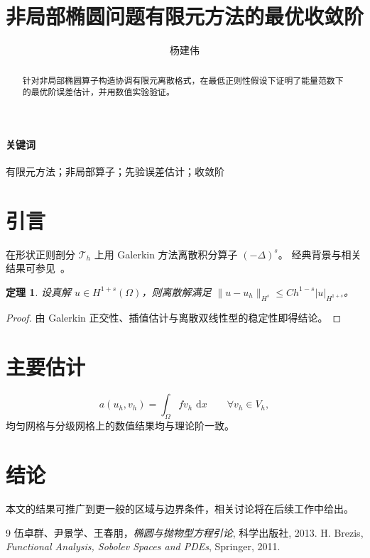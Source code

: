 \documentclass[UTF8,fontset=fandol,11pt]{ctexart}
\title{非局部椭圆问题有限元方法的最优收敛阶}
\author{杨建伟}
\date{}
\newtheorem{theorem}{定理}[section]
\newcommand{\Om}{\Omega}
\newcommand{\dd}{\,\mathrm{d}}
\begin{document}
\maketitle
\begin{abstract}
针对非局部椭圆算子构造协调有限元离散格式，在最低正则性假设下证明了能量范数下的最优阶误差估计，并用数值实验验证。
\end{abstract}
\paragraph{关键词} 有限元方法；非局部算子；先验误差估计；收敛阶

\section{引言}
在形状正则剖分 $\mathcal{T}_h$ 上用 Galerkin 方法离散积分算子 $(-\Delta)^s$。
经典背景与相关结果可参见~\cite{Evans,Brezis}。

\begin{theorem}
设真解 $u\in H^{1+s}(\Om)$，则离散解满足 $\|u-u_h\|_{H^s}\le Ch^{1-s}|u|_{H^{1+s}}$。
\end{theorem}

\begin{proof}
由 Galerkin 正交性、插值估计与离散双线性型的稳定性即得结论。
\end{proof}

\section{主要估计}
\begin{equation}
a(u_h,v_h)=\int_\Om f v_h\,\dd x\qquad\forall v_h\in V_h,
\end{equation}
均匀网格与分级网格上的数值结果均与理论阶一致。

\section{结论}
本文的结果可推广到更一般的区域与边界条件，相关讨论将在后续工作中给出。

\begin{thebibliography}{9}
 伍卓群、尹景学、王春朋，\emph{椭圆与抛物型方程引论}, 科学出版社, 2013.
 H. Brezis, \emph{Functional Analysis, Sobolev Spaces and PDEs}, Springer, 2011.
\end{thebibliography}
\end{document}
